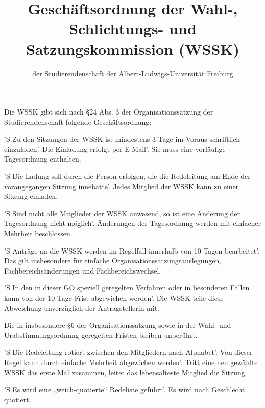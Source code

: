 \documentclass[fontsize=12pt,parskip=half]{scrartcl}
\begin{document}
\subject{Lesefassung}
\title{Geschäftsordnung der Wahl-, Schlichtungs- und Satzungskommission (WSSK)}
\subtitle{der Studierendenschaft der Albert-Ludwigs-Universität Freiburg}
\date{}
\maketitle

\pagebreak



Die WSSK gibt sich nach §24 Abs. 3 der Organisationssatzung der
Studierendenschaft folgende Geschäftsordnung:

\begin{contract}
  'S Zu den Sitzungen der WSSK ist mindestens 3 Tage im Voraus schriftlich
  einzuladen'. Die Einladung erfolgt per E-Mail'. Sie muss eine vorläufige
  Tagesordnung enthalten.

  'S Die Ladung soll durch die Person erfolgen, die die Redeleitung am Ende der
  vorangegangen Sitzung innehatte'. Jedes Mitglied der WSSK kann zu einer
  Sitzung einladen.

  'S Sind nicht alle Mitglieder der WSSK anwesend, so ist eine Änderung der
  Tagesordnung nicht möglich'. Änderungen der Tagesordnung werden mit einfacher
  Mehrheit beschlossen.

  'S Anträge an die WSSK werden im Regelfall innerhalb von 10 Tagen bearbeitet'.
  Das gilt insbesondere für einfache Organisationssatzungsauslegungen‚
  Fachbereichsänderungen und Fachbereichswechsel.

  'S In den in dieser GO speziell geregelten Verfahren oder in besonderen Fällen
  kann von der 10-Tage Frist abgewichen werden'. Die WSSK teile diese Abweichung
  unverzüglich der Antragstellerin mit.

  Die in insbesondere §6 der Organisationssatzung sowie in der Wahl- und
  Urabstimmungsordnung geregelten Fristen bleiben unberührt.

  'S Die Redeleitung rotiert zwischen den Mitgliedern nach Alphabet'. Von dieser
  Regel kann durch einfache Mehrheit abgewichen werden'. Tritt eine neu gewählte
  WSSK das erste Mal zusammen, leitet das lebensälteste Mitglied die Sitzung.

  'S Es wird eine „weich-quotierte“ Redeliste geführt'. Es wird nach Geschlecht
  quotiert.


\end{contract}
\end{document}
